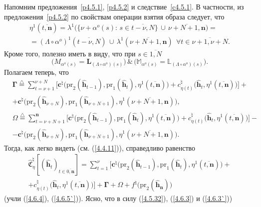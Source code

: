 \documentclass[11pt,twoside]{report}
\newcommand{\df}{\stackrel{\triangle}{=}}
\newcommand{\ov}{\overline}
\newcommand{\La}{\Lambda}
\newcommand{\la}{\lambda}
\newcommand{\al}{\alpha}
\newcommand{\fa}{\forall}
\newcommand{\bbl}{{\mathbb L}}
\newcommand{\bbm}{{\mathbb M}}
\newcommand{\zc}{{\mathbf c}}
\newcommand{\nn}{{\mathbf n}}
\begin{document}
{{Напомним предложения~\ref{p4.5.1}, \ref{p4.5.2} и следствие~\ref{c4.5.1}. В частности,
из предложения~\ref{p4.5.2}  по свойствам операции взятия образа следует, что
\begin{eqnarray}
&\eta^1(\ov{t,\mathbf{n}}) = \la^1\bigl(\{\nu+\al^o(s):\,s\in \ov{t-\nu,N}\}\,\cup\,
\ov{\nu+N+1,\nn}\bigl) =
&\nonumber\\
&= (\La \circ\al^o)^1(\ov{t-\nu,N})\,\cup\, \la^1(\ov{\nu+N+1,\nn})\ \ \fa t\in \ov{\nu+1,\nu+N}.
&\label{4.6.3`}
\end{eqnarray}
Кроме того, полезно иметь в виду, что при $s\in \ov{1,N}$
$$\bigl(M_{\al^o(s)} = \mathbf{L}_{(\La\circ \al^o)(s)}\bigl)\,\&\,\bigl(\bbm_{\al^o(s)} =
\bbl_{(\La\circ \al^o)(s)}\bigl).
$$
Полагаем теперь, что \cite[(5.10), (5.11)]{Cha13`}
\begin{eqnarray}
&\mathbf{\Gamma}\df \sum\limits_{t=\nu+1}^{\nu+N}
\bigl[\zc^\natural\bigl(\mathrm{pr}_2(\hat{\mathbf{h}}_{t-1}),\mathrm{pr}_1(\hat{\mathbf{h}}_t),
\eta^1(\ov{t,\nn})\bigl) + c_{\eta(t)}^\natural\bigl(\hat{\mathbf{h}}_t,\eta^1(\ov{t,\nn})\bigl)\bigl] +
&\nonumber\\
&+\zc^\natural\bigl(\mathrm{pr}_2(\hat{\mathbf{h}}_{\nu+N}),\mathrm{pr}_1
(\hat{\mathbf{h}}_{\nu+N+1}),\eta^1(\ov{\nu+N+1,\nn})\bigl),
&\label{4.6.4}
\end{eqnarray}
\begin{eqnarray}
&\Omega\df \sum\limits_{t=\nu+N+1}^\nn \bigl[\zc^\natural\bigl(\mathrm{pr}_2(\hat{\mathbf{h}}_{t-1}),
\mathrm{pr}_1(\hat{\mathbf{h}}_t),
\eta^1(\ov{t,\nn})\bigl) + c_{\eta(t)}^\natural\bigl(\hat{\mathbf{h}}_t,\eta^1(\ov{t,\nn})\bigl)\bigl] -
&\nonumber\\
&- \zc^\natural\bigl(\mathrm{pr}_2(\hat{\mathbf{h}}_{\nu+N}),\mathrm{pr}_1
(\hat{\mathbf{h}}_{\nu+N+1}),\eta^1(\ov{\nu+N+1,\nn})\bigl).
&\label{4.6.5`}
\end{eqnarray}
Тогда, как легко видеть (см. (\ref{4.4.11})), справедливо равенство
$$
\begin{array}{c}
\widehat{\mathfrak{C}}_\eta^\natural[(\hat{\mathbf{h}}_t)_{t\in\ov{0,\nn}}]=
\sum\limits_{t=1}^\nu \bigl[\zc^\natural\bigl(\mathrm{pr}_2(\hat{\mathbf{h}}_{t-1}),
\mathrm{pr}_1(\hat{\mathbf{h}}_t),
\eta^1(\ov{t,\nn})\bigl) +
\\
+c_{\eta(t)}^\natural\bigl(\hat{\mathbf{h}}_t,\eta^1(\ov{t,\nn})\bigl)\bigl]
+\mathbf{\Gamma} + \Omega +f^\natural\bigl(\mathrm{pr}_2(\hat{\mathbf{h}}_\nn)\bigl)
\end{array}
$$
(учли (\ref{4.6.4}), (\ref{4.6.5`})). Ясно, что в силу (\ref{4.5.32}), (\ref{4.6.3}) и (\ref{4.6.3`}))
}}
\end{document}

